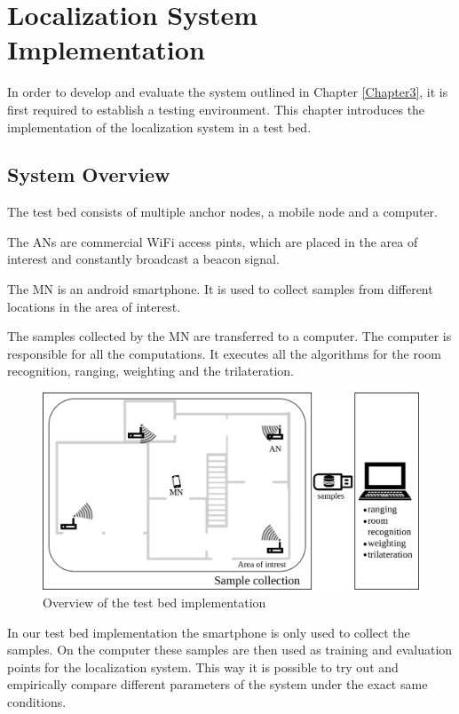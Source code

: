 \chapter{Localization System Implementation}

\label{Chapter4}

In order to develop and evaluate the system outlined in Chapter \ref{Chapter3}, it is first required to establish a testing environment.
This chapter introduces the implementation of the localization system in a test bed.

\section{System Overview}

The test bed consists of multiple anchor nodes, a mobile node and a computer.

The ANs are commercial WiFi access pints, which are placed in the area of interest and constantly broadcast a beacon signal.

The MN is an android smartphone. It is used to collect samples from different locations in the area of interest.

The samples collected by the MN are transferred to a computer. The computer is responsible for all the computations. It executes all the algorithms for the room recognition, ranging, weighting and the trilateration.

\begin{figure}[ht]
\centering
\includegraphics[width=\textwidth]{Figures/SystemImplementationOverview}
\decoRule
\caption[Test bed implementation overview]{Overview of the test bed implementation}
\label{fig:localizationSystemOverview}
\end{figure}

In our test bed implementation the smartphone is only used to collect the samples. On the computer these samples are then used as training and evaluation points for the localization system. This way it is possible to try out and empirically compare different parameters of the system under the exact same conditions.

